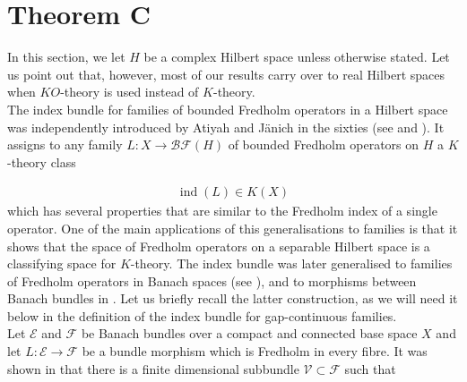 \documentclass[a4paper,10pt]{article}
\DeclareMathOperator{\ind}{ind}
\DeclareMathOperator{\sfl}{sf}
\begin{document}







\section{Theorem C}
In this section, we let $H$ be a complex Hilbert space unless otherwise stated. Let us point out that, however, most of our results carry over to real Hilbert spaces when $KO$-theory is used instead of $K$-theory.\\ 
The index bundle for families of bounded Fredholm operators in a Hilbert space was independently introduced by Atiyah and J\"anich in the sixties (see \cite{Atiyah} and \cite{Janich}). It assigns to any family $L:X\rightarrow\mathcal{BF}(H)$ of bounded Fredholm operators on $H$ a $K$-theory class

\begin{align}\label{AtiyahJanich}
\ind(L)\in K(X)
\end{align}
which has several properties that are similar to the Fredholm index of a single operator. One of the main applications of this generalisations to families is that it shows that the space of Fredholm operators on a separable Hilbert space is a classifying space for $K$-theory. The index bundle was later generalised to families of Fredholm operators in Banach spaces (see \cite{Russian}), and to morphisms between Banach bundles in \cite{indbundleIch}. Let us briefly recall the latter construction, as we will need it below in the definition of the index bundle for gap-continuous families.\\
Let $\mathcal{E}$ and $\mathcal{F}$ be Banach bundles over a compact and connected base space $X$ and let $L:\mathcal{E}\rightarrow\mathcal{F}$ be a bundle morphism which is Fredholm in every fibre. It was shown in \cite{indbundleIch} that there is a finite dimensional subbundle $\mathcal{V}\subset\mathcal{F}$ such that
\end{document}
